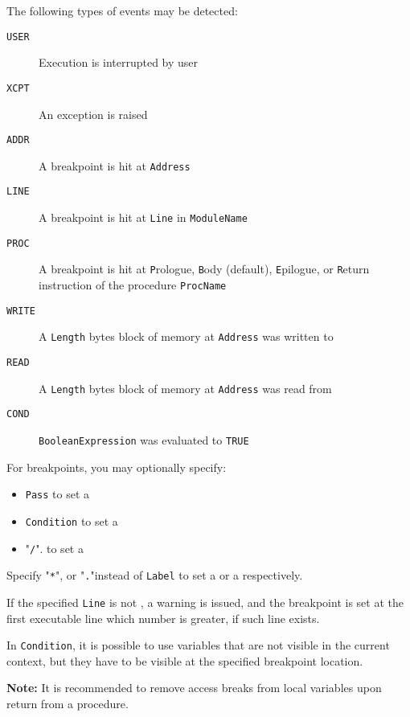 The following types of events may be detected:
\begin{description}
\item[{\tt USER}]  Execution is interrupted by user
\item[{\tt XCPT}]  An exception is raised
\item[{\tt ADDR}]  A breakpoint is hit at \verb'Address'
\item[{\tt LINE}]  A breakpoint is hit at \verb'Line' in \verb'ModuleName'
\item[{\tt PROC}]  A breakpoint is hit at \verb'P'rologue, 
                    \verb'B'ody (default), \verb'E'pilogue, or 
                    \verb'R'eturn instruction of the procedure \verb'ProcName'
\item[{\tt WRITE}] A \verb'Length' bytes block of memory at \verb'Address' was written to
\item[{\tt READ}]  A \verb'Length' bytes block of memory at \verb'Address' was read from
\item[{\tt COND}]  \verb'BooleanExpression' was evaluated to \verb'TRUE'
\end{description}


For breakpoints, you may optionally specify:

\begin{itemize}
\item \verb'Pass' to set a 
\item \verb'Condition' to set a 
\item  "\verb'/'". to set a 
\end{itemize}

Specify "\verb'*'", or "\verb'.'"instead of \verb'Label' to set a 
 or a 
 respectively.

If the specified \verb'Line' is not ,
a warning is issued, and the breakpoint is set at the first executable line which
number is greater, if such line exists.

In \verb'Condition', it is possible to use variables that are not visible
in the current context, but they have to be visible at the specified
breakpoint location.


{\bf Note:} It is recommended to remove access breaks from local variables
upon return from a procedure.

